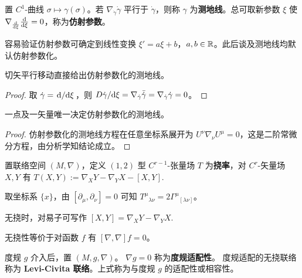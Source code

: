 \begin{definition}
    置 $C^1$-曲线 $\sigma\mapsto\gamma(\sigma)$。若 $\nabla_{\dot\gamma} \dot\gamma$ 平行于 $\dot\gamma$，则称 $\gamma$ 为\textbf{测地线}。总可取新参数 $\xi$ 使 $\nabla_{\dv{\xi}} \dv{\xi}=0$，称为\textbf{仿射参数}。
\end{definition}
\begin{remark}
    容易验证仿射参数可确定到线性变换 $\xi'=a\xi +b$，$a,b\in\mathbb{R}$。此后谈及测地线均默认仿射参数化。
\end{remark}
 

\begin{theorem}
    切矢平行移动直接给出仿射参数化的测地线。
\end{theorem}
\begin{proof}
取 $\dot\gamma=\dv*{\xi}$，则 ${D \dot\gamma}/{\dd \xi}=\nabla_{\dot\gamma} \bar{\dot\gamma}=\nabla_{\dot\gamma} {\dot\gamma}=0$。
\end{proof}

\begin{theorem}
    一点及一矢量唯一决定仿射参数化的测地线。
\end{theorem}
\begin{proof}
    仿射参数化的测地线方程在任意坐标系展开为 $U^\nu \nabla_\nu U^\mu=0$，这是二阶常微分方程，由分析学知结论成立。
\end{proof}

\begin{definition}
    置联络空间 $(M,\nabla)$，定义 $(1,2)$ 型 $C^{r-1}$-张量场 $T$ 为\textbf{挠率}，对 $C^r$-矢量场 $X,Y$ 有 $T(X,Y):=\nabla_XY-\nabla_YX-[X,Y].$
\end{definition}

\begin{theorem}
    取坐标系 $\{x\}$，由 $[\partial_\mu,\partial_\nu]=0$ 可知 ${T^\mu}_{\lambda\nu}=2{\Gamma^\mu}_{[\lambda\nu]}$。
\end{theorem}

\begin{theorem}
    无挠时，对易子可写作 $[X,Y]=\nabla_XY-\nabla_YX.$
\end{theorem}

\begin{theorem}
    无挠性等价于对函数 $f$ 有 $[\nabla,\nabla]f=0$。
\end{theorem}

\begin{definition}
    度规 $g$ 介入后，置 $(M,g,\nabla)$。
    $\nabla g=0$ 称为\textbf{度规适配性}。
    度规适配的无挠联络称为 \textbf{Levi-Civita 联络}。上式称为与度规 $g$ 的适配性或相容性。
\end{definition}


